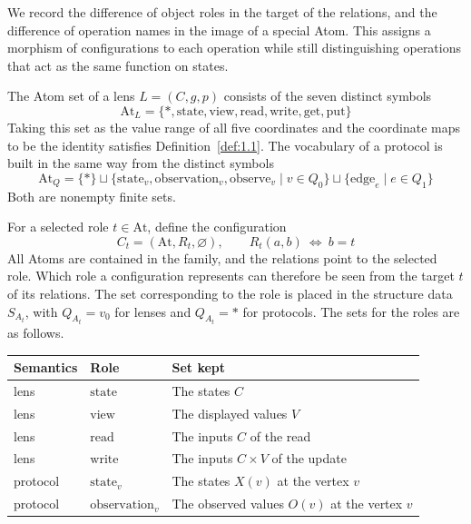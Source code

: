 \begin{construction}\label{cons:1.39}

We record the difference of object roles in the target of the relations, and
the difference of operation names in the image of a special Atom.
This assigns a morphism of configurations to each operation while still
distinguishing operations that act as the same function on states.

The Atom set of a lens $L=(C,g,p)$ consists of the seven distinct symbols
\[
\mathrm{At}_L=
\{*,\mathrm{state},\mathrm{view},\mathrm{read},
\mathrm{write},\mathrm{get},\mathrm{put}\}
\]
Taking this set as the value range of all five coordinates and the coordinate
maps to be the identity satisfies Definition~\ref{def:1.1}.
The vocabulary of a protocol is built in the same way from the distinct
symbols
\[
\mathrm{At}_Q=
\{*\}\sqcup
\{\mathrm{state}_v,\mathrm{observation}_v,\mathrm{observe}_v
\mid v\in Q_0\}
\sqcup\{\mathrm{edge}_e\mid e\in Q_1\}
\]
Both are nonempty finite sets.

For a selected role $t\in\mathrm{At}$, define the configuration
\[
C_t=(\mathrm{At},R_t,\varnothing),\qquad
R_t(a,b)\ \Longleftrightarrow\ b=t
\]
All Atoms are contained in the family, and the relations point to the selected
role.
Which role a configuration represents can therefore be seen from the target
$t$ of its relations.
The set corresponding to the role is placed in the structure data $S_{A_t}$,
with $Q_{A_t}=v_0$ for lenses and $Q_{A_t}=*$ for protocols.
The sets for the roles are as follows.

\begin{xltabular}{\linewidth}{@{}LLL@{}}
\toprule
Semantics & Role & Set kept \\
\midrule
\endhead
lens & $\mathrm{state}$ & The states $C$ \\
\addlinespace[3pt]
lens & $\mathrm{view}$ & The displayed values $V$ \\
\addlinespace[3pt]
lens & $\mathrm{read}$ & The inputs $C$ of the read \\
\addlinespace[3pt]
lens & $\mathrm{write}$ & The inputs $C\times V$ of the update \\
\addlinespace[3pt]
protocol & $\mathrm{state}_v$ & The states $X(v)$ at the vertex $v$ \\
\addlinespace[3pt]
protocol & $\mathrm{observation}_v$ & The observed values $O(v)$ at the vertex $v$ \\
\bottomrule
\end{xltabular}


\end{construction}
